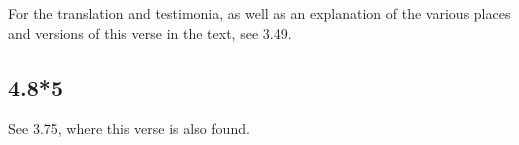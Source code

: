 \begin{ekdosis}



\begin{philcomm}[hp04_008_4]
For the translation and testimonia, as well as an explanation of the various places and versions of this verse in the text, see 3.49.
\end{philcomm}


\subsection*{4.8*5}
\begin{philcomm}[hp04_008_5]
See 3.75, where this verse is also found.
\end{philcomm}


\end{ekdosis}
